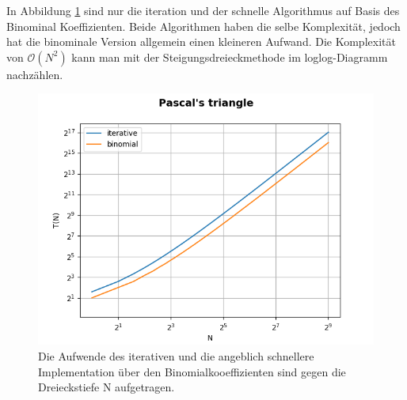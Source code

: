 \documentclass[
   draft=false
  ,paper=a4
  ,twoside=false
  ,fontsize=11pt
  ,headsepline
  ,DIV11
  ,parskip=full+
]{scrartcl} %
\begin{document}
In Abbildung \ref{fig:iterfast} sind nur die iteration und der schnelle Algorithmus auf Basis des Binominal Koeffizienten. Beide Algorithmen haben die selbe Komplexität, jedoch hat die binominale Version allgemein einen kleineren Aufwand. Die Komplexität von $\mathcal{O}(N^2)$ kann man mit der Steigungsdreieckmethode im loglog-Diagramm nachzählen.
	
\begin{figure}[htp]
	\label{fig:iterfast}
  	\centering
    \includegraphics[width=\textwidth]{./IMG/iterfast.png}
    \caption[iter fast]{Die Aufwende des iterativen und die angeblich schnellere Implementation über den Binomialkooeffizienten sind gegen die Dreieckstiefe N aufgetragen.}
\end{figure}
\end{document}
